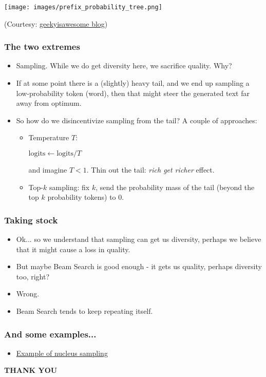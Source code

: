 \documentclass[11pt]{beamer}
\begin{document}
\begin{frame}
\begin{center}
\texttt{[image: images/prefix\_probability\_tree.png]}
\end{center}
(Courtesy: \href{https://geekyisawesome.blogspot.com/2016/10/using-beam-search-to-generate-most.html}{geekyisawesome blog})
\end{frame}


\begin{frame}
  \frametitle{The two extremes}
  \begin{itemize}
    \item Sampling. While we do get diversity here, we sacrifice quality. Why?
    \item If at some point there is a (slightly) heavy tail, and we end up sampling
    a low-probability token (word), then that might steer the generated text
    far away from optimum.
    \item So how do we disincentivize sampling from the tail? A couple of approaches:
    \begin{itemize}
      \item Temperature $T$:
      \begin{center}
        $\mathrm{logits} \leftarrow \mathrm{logits}/{T}$
      \end{center}
      and imagine $T < 1$. Thin out the tail: {\em rich get richer} effect.
      \item Top-$k$ sampling: fix $k$, send the probability mass of the tail (beyond the top $k$
      probability tokens) to $0$.
    \end{itemize}
  \end{itemize}
\end{frame}

\begin{frame}
  \frametitle{Taking stock}
  \begin{itemize}
\item
Ok... so we understand that sampling can get us diversity, perhaps we believe that it might cause
a loss in quality.
\pause
\item
But maybe Beam Search is good enough - it gets us quality, perhaps diversity too,
right?
\pause
  \item Wrong.
  \pause
  \item Beam Search tends to keep repeating itself.
\end{itemize}
\end{frame}
\begin{frame}
  \frametitle{And some examples...}
  \begin{itemize}
    \item \href{https://github.com/minimaxir/gpt-2-simple/issues/51}{Example of nucleus sampling}
  \end{itemize}
\end{frame}


\begin{frame}
\begin{center}
{\bf THANK YOU}
\end{center}
\end{frame}
\end{document}
